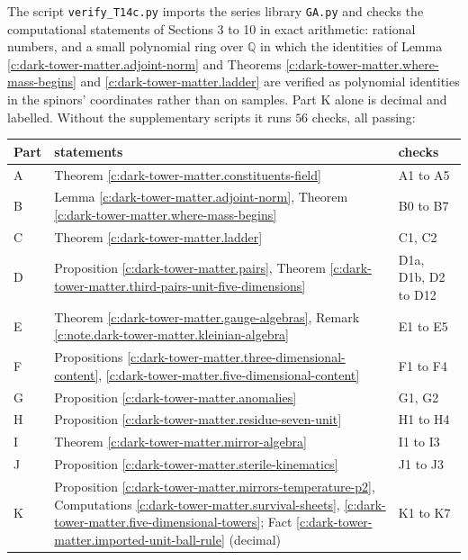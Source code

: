 \documentclass[11pt]{article}
\theoremstyle{definition}
\theoremstyle{plain}
\providecommand{\file}{}\renewcommand{\file}[1]{\texttt{#1}}
\begin{document}
\label{c:note.dark-tower-matter.setting-machine-verification}
The script \file{verify\_T14c.py} \cite{ButlerVerifyT14c} imports the series library \file{GA.py} and checks the computational statements of Sections 3 to 10 in exact arithmetic: rational numbers, and a small polynomial ring over $\mathbb{Q}$ in which the identities of Lemma \ref{c:dark-tower-matter.adjoint-norm} and Theorems \ref{c:dark-tower-matter.where-mass-begins} and \ref{c:dark-tower-matter.ladder} are verified as polynomial identities in the spinors' coordinates rather than on samples. Part K alone is decimal and labelled. Without the supplementary scripts it runs $56$ checks, all passing:

\begin{center} \begin{tabular}{@{}lll@{}}
\toprule
Part & statements & checks \\
\midrule
A & Theorem \ref{c:dark-tower-matter.constituents-field} & A1 to A5 \\
B & Lemma \ref{c:dark-tower-matter.adjoint-norm}, Theorem \ref{c:dark-tower-matter.where-mass-begins} & B0 to B7 \\
C & Theorem \ref{c:dark-tower-matter.ladder} & C1, C2 \\
D & Proposition \ref{c:dark-tower-matter.pairs}, Theorem \ref{c:dark-tower-matter.third-pairs-unit-five-dimensions} & D1a, D1b, D2 to D12 \\
E & Theorem \ref{c:dark-tower-matter.gauge-algebras}, Remark \ref{c:note.dark-tower-matter.kleinian-algebra} & E1 to E5 \\
F & Propositions \ref{c:dark-tower-matter.three-dimensional-content}, \ref{c:dark-tower-matter.five-dimensional-content} & F1 to F4 \\
G & Proposition \ref{c:dark-tower-matter.anomalies} & G1, G2 \\
H & Proposition \ref{c:dark-tower-matter.residue-seven-unit} & H1 to H4 \\
I & Theorem \ref{c:dark-tower-matter.mirror-algebra} & I1 to I3 \\
J & Proposition \ref{c:dark-tower-matter.sterile-kinematics} & J1 to J3 \\
K & Proposition \ref{c:dark-tower-matter.mirrors-temperature-p2}, Computations \ref{c:dark-tower-matter.survival-sheets}, \ref{c:dark-tower-matter.five-dimensional-towers}; Fact \ref{c:dark-tower-matter.imported-unit-ball-rule} (decimal) & K1 to K7 \\
\bottomrule
\end{tabular}
\end{center}
\end{document}
